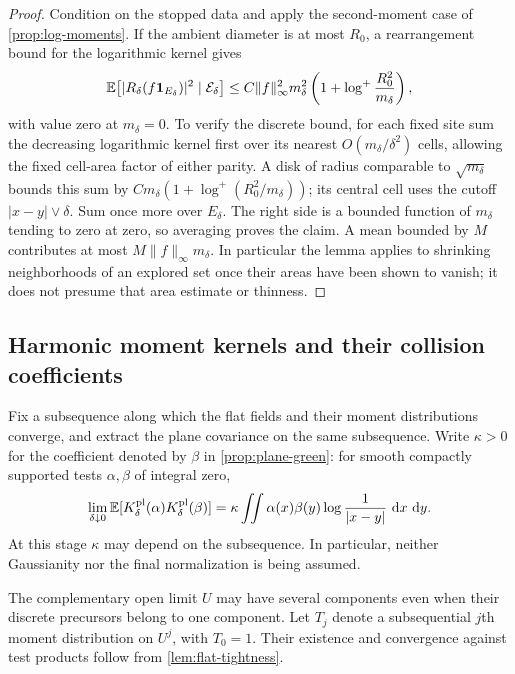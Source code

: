 \begin{proof}
Condition on the stopped data and apply the second-moment case of
\cref{prop:log-moments}. If the ambient diameter is at most $R_0$, a
rearrangement bound for the logarithmic kernel gives
\[
 \mathbb E\bigl[|R_\delta(f\mathbf 1_{E_\delta})|^2\mid\mathcal E_\delta\bigr]
 \le C\|f\|_\infty^2 m_\delta^2
          \left(1+\log^+\frac{R_0^2}{m_\delta}\right),
\]
with value zero at $m_\delta=0$. To verify the discrete bound, for each
fixed site sum the decreasing logarithmic kernel first over its nearest
$O(m_\delta/\delta^2)$ cells, allowing the fixed cell-area factor of either
parity. A disk of radius comparable to
$\sqrt{m_\delta}$ bounds this sum by
$C m_\delta(1+\log^+(R_0^2/m_\delta))$; its central cell uses the cutoff
$|x-y|\vee\delta$. Sum once more over $E_\delta$. The right side is a
bounded function of $m_\delta$ tending to zero at zero, so averaging proves
the claim. A mean bounded by $M$ contributes at most
$M\|f\|_\infty m_\delta$. In particular the lemma applies to shrinking
neighborhoods of an explored set once their areas have been shown to vanish;
it does not presume that area estimate or thinness.
\end{proof}

\subsection{Harmonic moment kernels and their collision coefficients}

Fix a subsequence along which the flat fields and their moment
distributions converge, and extract the plane covariance on the same
subsequence. Write $\kappa>0$ for the coefficient denoted by $\beta$ in
\cref{prop:plane-green}:
for smooth compactly supported tests $\alpha,\beta$ of integral zero,
\begin{equation}
 \lim_{\delta\downarrow0}
 \mathbb E[K^{\mathrm{pl}}_\delta(\alpha)
       K^{\mathrm{pl}}_\delta(\beta)]
 =\kappa\iint\alpha(x)\beta(y)\log\frac1{|x-y|}\,\,\mathrm d x\,\,\mathrm d y.
 \label{eq:subsequential-kappa}
\end{equation}
At this stage $\kappa$ may depend on the subsequence. In particular,
neither Gaussianity nor the final normalization is being assumed.

The complementary open limit \(U\) may have several components even when
their discrete precursors belong to one component. Let \(T_j\) denote a
subsequential \(j\)th moment distribution on \(U^j\), with \(T_0=1\).
Their existence and convergence against test products follow from
\cref{lem:flat-tightness}.

